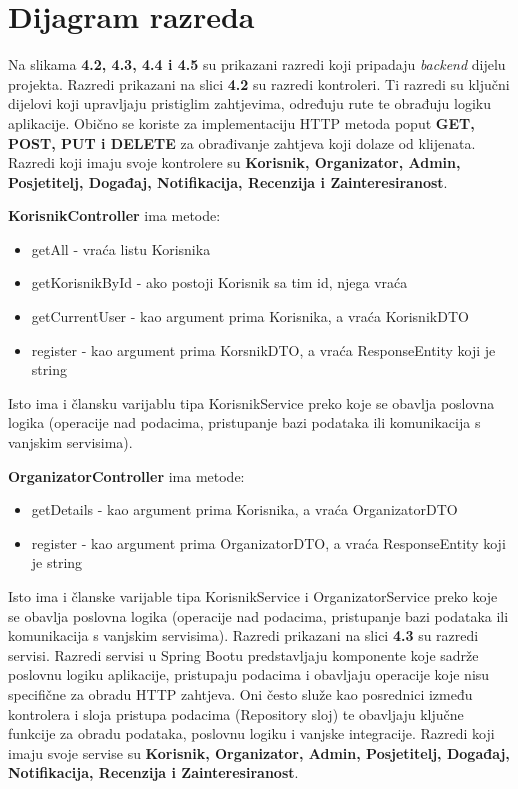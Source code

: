 			
		\section{Dijagram razreda}
		
			Na slikama \textbf{4.2, 4.3, 4.4 i 4.5} su prikazani razredi koji pripadaju \textit{backend} dijelu projekta. 
			\newline
			\newline
			Razredi prikazani na slici \textbf{4.2} su razredi kontroleri. Ti razredi su ključni dijelovi koji upravljaju pristiglim zahtjevima, određuju rute te obrađuju logiku aplikacije. Obično se koriste za implementaciju HTTP metoda poput \textbf{GET, POST, PUT i DELETE} za obrađivanje zahtjeva koji dolaze od klijenata. Razredi koji imaju svoje kontrolere su \textbf{Korisnik, Organizator, Admin, Posjetitelj, Događaj, Notifikacija, Recenzija i Zainteresiranost}.
			\newline
			
			\textbf{KorisnikController} ima metode: 
			\begin{itemize}
				\item getAll - vraća listu Korisnika
				\item getKorisnikById - ako postoji Korisnik sa tim id, njega vraća
				\item getCurrentUser - kao argument prima Korisnika, a vraća KorisnikDTO
				\item register - kao argument prima KorsnikDTO, a vraća ResponseEntity koji je string
			\end{itemize}
			
			Isto ima i člansku varijablu tipa KorisnikService preko koje se obavlja poslovna logika (operacije nad podacima, pristupanje bazi podataka ili komunikacija s vanjskim servisima).
			\newline
			
				\textbf{OrganizatorController} ima metode: 
			\begin{itemize}
				\item getDetails - kao argument prima Korisnika, a vraća OrganizatorDTO
				\item register - kao argument prima OrganizatorDTO, a vraća ResponseEntity koji je string
			\end{itemize}
			
			Isto ima i članske varijable tipa KorisnikService i OrganizatorService preko koje se obavlja poslovna logika (operacije nad podacima, pristupanje bazi podataka ili komunikacija s vanjskim servisima).
			\newline
			\newline
			Razredi prikazani na slici \textbf{4.3} su razredi servisi. Razredi servisi u Spring Bootu predstavljaju komponente koje sadrže poslovnu logiku aplikacije, pristupaju podacima i obavljaju operacije koje nisu specifične za obradu HTTP zahtjeva. Oni često služe kao posrednici između kontrolera i sloja pristupa podacima (Repository sloj) te obavljaju ključne funkcije za obradu podataka, poslovnu logiku i vanjske integracije.
			Razredi koji imaju svoje servise su \textbf{Korisnik, Organizator, Admin, Posjetitelj, Događaj, Notifikacija, Recenzija i Zainteresiranost}.
			\newline
			
